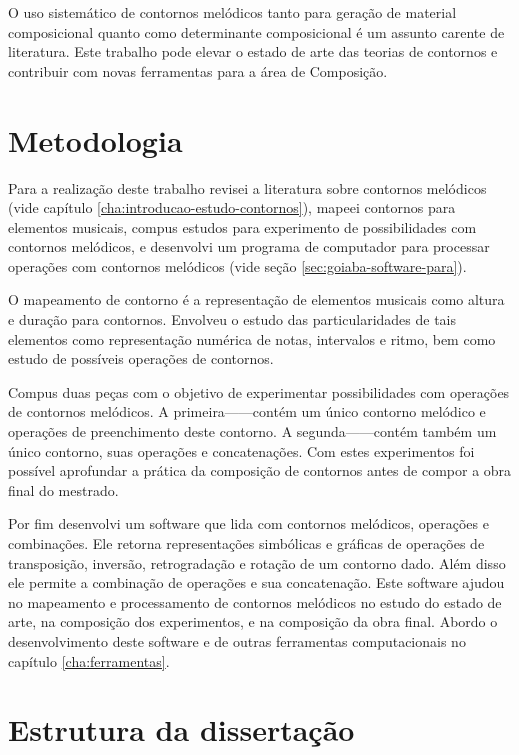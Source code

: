 O uso sistemático de contornos melódicos tanto para geração de
material composicional quanto como determinante composicional é um
assunto carente de literatura. Este trabalho pode elevar o estado de
arte das teorias de contornos e contribuir com novas ferramentas para
a área de Composição.

\section{Metodologia}
\label{sec:metodologia}

Para a realização deste trabalho revisei a literatura sobre contornos
melódicos (vide capítulo \ref{cha:introducao-estudo-contornos}),
mapeei contornos para elementos musicais, compus estudos para
experimento de possibilidades com contornos melódicos, e desenvolvi um
programa de computador para processar operações com contornos
melódicos (vide seção \ref{sec:goiaba-software-para}).

O mapeamento de contorno é a representação de elementos musicais como
altura e duração para contornos. Envolveu o estudo das
particularidades de tais elementos como representação numérica de
notas, intervalos e ritmo, bem como estudo de possíveis operações de
contornos.

Compus duas peças com o objetivo de experimentar possibilidades com
operações de contornos melódicos. A primeira------contém um único contorno
melódico e operações de preenchimento deste contorno. A
segunda------contém também um único
contorno, suas operações e concatenações. Com estes experimentos foi
possível aprofundar a prática da composição de contornos antes de
compor a obra final do mestrado.

Por fim desenvolvi um software que lida com contornos melódicos,
operações e combinações. Ele retorna representações simbólicas e
gráficas de operações de transposição, inversão, retrogradação e
rotação de um contorno dado. Além disso ele permite a combinação de
operações e sua concatenação. Este software ajudou no mapeamento e
processamento de contornos melódicos no estudo do estado de arte, na
composição dos experimentos, e na composição da obra final. Abordo o
desenvolvimento deste software e de outras ferramentas computacionais
no capítulo \ref{cha:ferramentas}.

\section{Estrutura da dissertação}
\label{sec:estr-da-diss}

